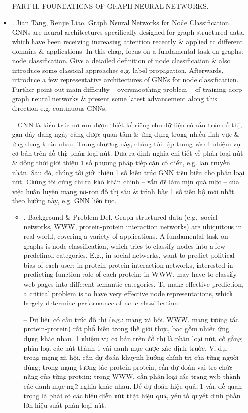 \documentclass{article}
\begin{document}
\begin{itemize}
    PART II. FOUNDATIONS OF GRAPH NEURAL NETWORKS.
    \item {. {\sc Jian Tang, Renjie Liao}. Graph Neural Networks for Node Classification.} GNNs are neural architectures specifically designed for graph-structured data, which have been receiving increasing attention recently \& applied to different domains \& applications. In this chap, focus on a fundamental task on graphs: node classification. Give a detailed definition of node classification \& also introduce some classical approaches e.g. label propagation. Afterwards, introduce a few representative architectures of GNNs for node classification. Further point out main difficulty -- oversmoothing problem -- of training deep graph neural networks \& present some latest advancement along this direction e.g. continuous GNNs.

    -- GNN là kiến trúc nơ-ron được thiết kế riêng cho dữ liệu có cấu trúc đồ thị, gần đây đang ngày càng được quan tâm \& ứng dụng trong nhiều lĩnh vực \& ứng dụng khác nhau. Trong chương này, chúng tôi tập trung vào 1 nhiệm vụ cơ bản trên đồ thị: phân loại nút. Đưa ra định nghĩa chi tiết về phân loại nút \& đồng thời giới thiệu 1 số phương pháp tiếp cận cổ điển, e.g. lan truyền nhãn. Sau đó, chúng tôi giới thiệu 1 số kiến trúc GNN tiêu biểu cho phân loại nút. Chúng tôi cũng chỉ ra khó khăn chính -- vấn đề làm mịn quá mức -- của việc huấn luyện mạng nơ-ron đồ thị sâu \& trình bày 1 số tiến bộ mới nhất theo hướng này, e.g. GNN liên tục.
    \begin{itemize}
        \item {. Background \& Problem Def.} Graph-structured data (e.g., social networks, WWW, protein-protein interaction networks) are ubiquitous in real-world, covering a variety of applications. A fundamental task on graphs is node classification, which tries to classify nodes into a few predefined categories. E.g., in social networks, want to predict political bias of each user; in protein-protein interaction networks, interested in predicting function role of each protein; in WWW, may have to classify web pages into different semantic categories. To make effective prediction, a critical problem is to have very effective node representations, which largely determine performance of node classification.

        -- Dữ liệu có cấu trúc đồ thị (e.g.: mạng xã hội, WWW, mạng tương tác protein-protein) rất phổ biến trong thế giới thực, bao gồm nhiều ứng dụng khác nhau. 1 nhiệm vụ cơ bản trên đồ thị là phân loại nút, cố gắng phân loại các nút thành 1 vài danh mục được xác định trước. Ví dụ, trong mạng xã hội, cần dự đoán khuynh hướng chính trị của từng người dùng; trong mạng tương tác protein-protein, cần dự đoán vai trò chức năng của từng protein; trong WWW, cần phân loại các trang web thành các danh mục ngữ nghĩa khác nhau. Để dự đoán hiệu quả, 1 vấn đề quan trọng là phải có các biểu diễn nút thật hiệu quả, yếu tố quyết định phần lớn hiệu suất phân loại nút.


\end{itemize}
\end{itemize}
\end{document}
